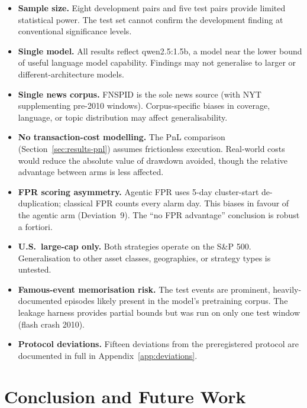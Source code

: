 \documentclass[11pt,a4paper]{article}
\begin{document}
\begin{itemize}
  \item \textbf{Sample size.} Eight development pairs and five test pairs
        provide limited statistical power. The test set cannot confirm the
        development finding at conventional significance levels.
  \item \textbf{Single model.} All results reflect qwen2.5:1.5b, a model
        near the lower bound of useful language model capability. Findings
        may not generalise to larger or different-architecture models.
  \item \textbf{Single news corpus.} FNSPID is the sole news source (with
        NYT supplementing pre-2010 windows). Corpus-specific biases in
        coverage, language, or topic distribution may affect generalisability.
  \item \textbf{No transaction-cost modelling.} The PnL comparison (Section~\ref{sec:results-pnl}) assumes frictionless execution. Real-world
        costs would reduce the absolute value of drawdown avoided, though
        the relative advantage between arms is less affected.
  \item \textbf{FPR scoring asymmetry.} Agentic FPR uses 5-day cluster-start
        de-duplication; classical FPR counts every alarm day. This biases in
        favour of the agentic arm (Deviation~9). The ``no FPR advantage''
        conclusion is robust a fortiori.
  \item \textbf{U.S.\ large-cap only.} Both strategies operate on the
        S\&P 500. Generalisation to other asset classes, geographies, or
        strategy types is untested.
  \item \textbf{Famous-event memorisation risk.} The test events are
        prominent, heavily-documented episodes likely present in the model's
        pretraining corpus. The leakage harness provides partial bounds but
        was run on only one test window (flash crash 2010).
  \item \textbf{Protocol deviations.} Fifteen deviations from the
        preregistered protocol are documented in full in
        Appendix~\ref{app:deviations}.
\end{itemize}

\section{Conclusion and Future Work}\label{sec:conclusion}
\end{document}
